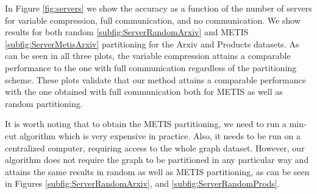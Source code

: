 \documentclass[lettersize,journal]{IEEEtran}
\begin{document}
In Figure \ref{fig:servers} we show the accuracy as a function of the number of servers for variable compression, full communication, and no communication. We show results for both random \ref{subfig:ServerRandomArxiv} and METIS \ref{subfig:ServerMetisArxiv} partitioning for the Arxiv and Products datasets. As can be seen in all three plots, the variable compression attains a comparable performance to the one with full communication regardless of the partitioning scheme. 
These plots validate that our method attains a comparable performance with the one obtained with full communication both for METIS as well as random partitioning. 



It is worth noting that to obtain the METIS partitioning, we need to run a min-cut algorithm which is very expensive in practice. Also, it needs to be run on a centralized computer, requiring access to the whole graph dataset. However, our algorithm does not require the graph to be partitioned in any particular way and attains the same results in random as well as METIS partitioning, as can be seen in Figures \ref{subfig:ServerRandomArxiv}, and \ref{subfig:ServerRandomProds}.
\end{document}
